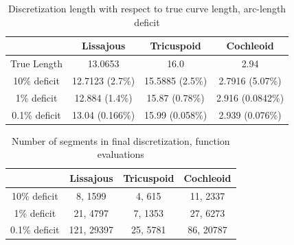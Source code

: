 \begin{table}[h!] \caption{\label{tab:curvelength} Discretization length with respect to true curve length, arc-length deficit }
\centering
\begin{tabular}{|c|c|c|c|}
\hline
 & Lissajous & Tricuspoid & Cochleoid \\
\hline
True Length & 13.0653 & 16.0 & 2.94\\
10\% deficit & 12.7123 (2.7\%) & 15.5885 (2.5\%) & 2.7916 (5.07\%)\\
1\% deficit & 12.884 (1.4\%) & 15.87 (0.78\%) & 2.916 (0.0842\%)\\
0.1\% deficit & 13.04 (0.166\%) & 15.99 (0.058\%) & 2.939 (0.076\%)\\
\hline
\end{tabular}
\end{table}

\begin{table}[h!] \caption{\label{tab:generationdata} Number of segments in final discretization, function evaluations }
\centering
\begin{tabular}{|c|c|c|c|}
\hline
 & Lissajous & Tricuspoid & Cochleoid \\
\hline
10\% deficit & 8, 1599 & 4, 615 & 11, 2337 \\
1\% deficit & 21, 4797 & 7, 1353 & 27, 6273 \\ 
0.1\% deficit & 121, 29397 & 25, 5781 & 86, 20787 \\ 
\hline
\end{tabular}
\end{table}
